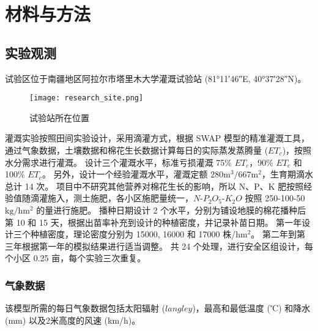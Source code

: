\chapter{材料与方法}

\section{实验观测}
试验区位于南疆地区阿拉尔市塔里木大学灌溉试验站 (\ang{81;11;46}E, \ang{40;37;28}N)。
\begin{figure}
    \centering
    \texttt{[image: research\_site.png]}
    \caption{试验站所在位置}
\end{figure}
灌溉实验按照田间实验设计，采用滴灌方式，根据 SWAP 模型\cite{swap2021}的精准灌溉工具，通过气象数据，土壤数据和棉花生长数据计算每日的实际蒸发蒸腾量 ($ET_c$)，按照水分需求进行灌溉。
设计三个灌溉水平，标准亏损灌溉 75\% $ET_c$，90\% $ET_c$ 和 100\% $ET_c$。
另外，设计一个经验灌溉水平，灌溉定额 $\mathrm{280 m^3 / 667m^2}$，生育期滴水总计 14 次。
项目中不研究其他营养对棉花生长的影响，所以 N、P、K 肥按照经验值随滴灌施入，测土施肥，各小区施肥量统一，$N$-$P_2O_5$-$K_2O$ 按照 250-100-50 $\mathrm{kg/hm^2}$ 的量进行施肥。
播种日期设计 2 个水平，分别为铺设地膜的棉花播种后第 10 和 15 天，根据出苗率补充到设计的种植密度，并记录补苗日期。
第一年设计三个种植密度，理论密度分别为 15000, 16000 和 17000 株/$\mathrm{hm^2}$。
第二年到第三年根据第一年的模拟结果进行适当调整。
共 24 个处理，进行安全区组设计，每个小区 0.25 亩，每个实验三次重复。

\subsection{气象数据}

该模型所需的每日气象数据包括太阳辐射 ($langley$)，最高和最低温度 (℃) 和降水 (mm) 以及2米高度的风速 (km/h)。

